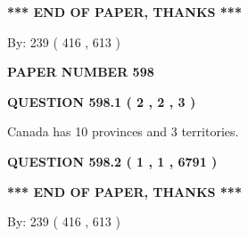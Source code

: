 \documentclass[12pt]{article}
\begin{document}
   
   
   
   
\vspace{1.0in} 
{\textbf{\large{ *** END OF PAPER, THANKS *** }}} 
   
   
\hspace{1.0in} By: 
 239 ( 416 ,  613 )
   
   
   
   
\newpage 
\setcounter{page}{ 
   598001 } 
   
   
   
   
 {\textbf{ \Large{ PAPER NUMBER  598  }}}
   
   
\vspace{0.2in}
   
   
   
   
   
   
 \vspace{0.2in}
 
 
 
 
   
   
  
\vspace{0.2in}
  
{\textbf{\Large{QUESTION
598.1 
 ( 2 , 2 , 3 )
}}}
  
  
 
 
\noindent{}
 
 
Canada has 10  provinces and 3 territories.
 
 
 
 
  
\vspace{0.2in}
  
{\textbf{\Large{QUESTION
598.2 
 ( 1 , 1 , 6791 )
}}}
  
  
   
   
 \vspace{0.2in}
 
   
   
   
   
\vspace{1.0in} 
{\textbf{\large{ *** END OF PAPER, THANKS *** }}} 
   
   
\hspace{1.0in} By: 
 239 ( 416 ,  613 )
   
   
   
   
\newpage 
\setcounter{page}{ 
   599001 } 
   
\end{document}
